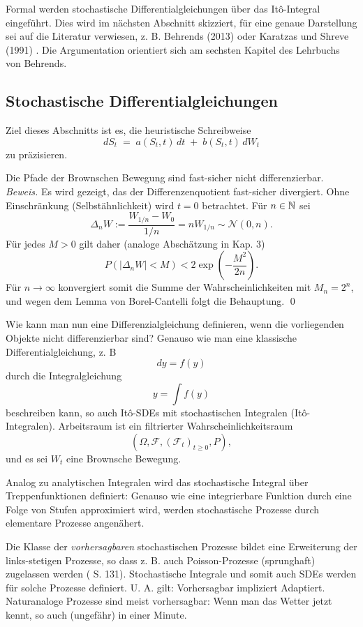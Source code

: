 Formal werden stochastische Differentialgleichungen über das It\^o-Integral eingeführt. Dies wird 
im nächsten Abschnitt skizziert, für eine genaue Darstellung sei auf die Literatur 
verwiesen, z. B. Behrends (2013) \cite{behrends} oder Karatzas und Shreve (1991) \cite{karatzas_brownian_1991}.
Die Argumentation orientiert sich am sechsten Kapitel des Lehrbuchs von Behrends.

\subsection{Stochastische Differentialgleichungen}

Ziel dieses Abschnitts ist es, die heuristische Schreibweise
$$
dS_t \;=\; a(S_t,t)\,dt \;+\; b(S_t,t)\,dW_t
$$
zu präzisieren.

\begin{lemma}
Die Pfade der Brownschen Bewegung sind fast-sicher nicht differenzierbar. \textit{Beweis.}
Es wird gezeigt, das der Differenzenquotient fast-sicher divergiert. Ohne Einschränkung (Selbstähnlichkeit) wird $t=0$ betrachtet. Für $n \in \Bbb N$ sei
$$\Delta_n W := \frac{W_{1/n} - W_0}{1/n}=n W_{1 / n} \sim \mathcal N(0, n).$$
Für jedes $M \gt 0$ gilt daher (analoge Abschätzung in Kap. 3)
$$P(\vert \Delta_n W \vert \lt M) \lt 2 \exp(- \frac{M^2}{2 n}).$$
Für $n \to \infty$ konvergiert somit die Summe der Wahrscheinlichkeiten mit $M_n = 2^n$, und wegen dem Lemma von Borel-Cantelli
folgt die Behauptung. \qed
\end{lemma}

Wie kann man nun eine Differenzialgleichung definieren, wenn die vorliegenden Objekte nicht differenzierbar sind? Genauso wie man eine klassische Differentialgleichung, z. B
$$dy = f(y)$$
durch die Integralgleichung
$$y = \int f(y)$$
beschreiben kann, so auch It\^o-SDEs mit stochastischen Integralen (It\^o-Integralen).
Arbeitsraum ist ein filtrierter Wahrscheinlichkeitsraum
$$
(\Omega,\mathcal F,(\mathcal F_t)_{t\ge 0},P),
$$
und es sei $W_t$ eine Brownsche Bewegung. 

Analog zu analytischen Integralen wird das stochastische Integral über Treppenfunktionen definiert:
Genauso wie eine integrierbare Funktion 
durch eine Folge von Stufen approximiert wird, werden stochastische Prozesse durch elementare Prozesse angenähert.

\begin{bem}
Die Klasse der \textit{vorhersagbaren} stochastischen Prozesse bildet eine Erweiterung der links-stetigen Prozesse, so dass 
z. B. auch Poisson-Prozesse (sprunghaft) zugelassen werden (\cite{karatzas_brownian_1991} S. 131).
Stochastische Integrale und somit auch SDEs werden für solche Prozesse definiert. U. A. gilt: Vorhersagbar impliziert Adaptiert.
Naturanaloge Prozesse sind meist vorhersagbar: Wenn man das Wetter jetzt kennt, so auch (ungefähr) in einer Minute.
\end{bem}

